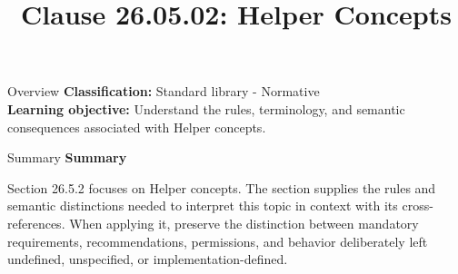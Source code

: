 \documentclass[10pt,letterpaper]{article}
\title{Clause 26.05.02: Helper Concepts}
\author{}
\date{}
\begin{document}
\maketitle
\begin{CornellOverviewBox}{Overview}
\textbf{Classification:} Standard library - Normative\\[2pt]
\textbf{Learning objective:} Understand the rules, terminology, and semantic consequences associated with Helper concepts.
\end{CornellOverviewBox}\begin{CornellSummaryBox}{Summary}
{\sffamily\bfseries\color{Accent} Summary}\par\vspace{3pt}Section 26.5.2 focuses on Helper concepts. The section supplies the rules and semantic distinctions needed to interpret this topic in context with its cross-references. When applying it, preserve the distinction between mandatory requirements, recommendations, permissions, and behavior deliberately left undefined, unspecified, or implementation-defined.
\end{CornellSummaryBox}
\end{document}
